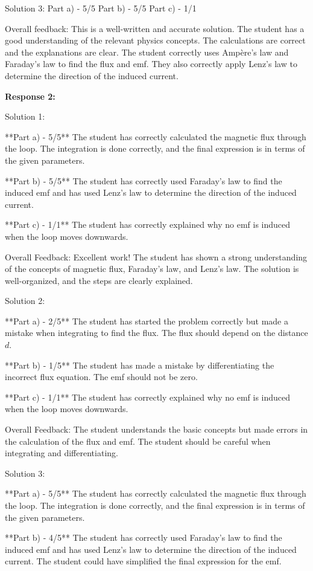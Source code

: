 \documentclass[a4paper,11pt]{article}
\begin{document}
Solution 3:
Part a) - 5/5
Part b) - 5/5
Part c) - 1/1

Overall feedback: This is a well-written and accurate solution. The student has a good understanding of the relevant physics concepts. The calculations are correct and the explanations are clear. The student correctly uses Ampère's law and Faraday's law to find the flux and emf. They also correctly apply Lenz's law to determine the direction of the induced current.

\bigskip    
\textbf{Response 2:}

Solution 1:

**Part a) - 5/5**
The student has correctly calculated the magnetic flux through the loop. The integration is done correctly, and the final expression is in terms of the given parameters.

**Part b) - 5/5**
The student has correctly used Faraday's law to find the induced emf and has used Lenz's law to determine the direction of the induced current.

**Part c) - 1/1**
The student has correctly explained why no emf is induced when the loop moves downwards.

Overall Feedback: Excellent work! The student has shown a strong understanding of the concepts of magnetic flux, Faraday's law, and Lenz's law. The solution is well-organized, and the steps are clearly explained.

Solution 2:

**Part a) - 2/5**
The student has started the problem correctly but made a mistake when integrating to find the flux. The flux should depend on the distance \(d\).

**Part b) - 1/5**
The student has made a mistake by differentiating the incorrect flux equation. The emf should not be zero.

**Part c) - 1/1**
The student has correctly explained why no emf is induced when the loop moves downwards.

Overall Feedback: The student understands the basic concepts but made errors in the calculation of the flux and emf. The student should be careful when integrating and differentiating.

Solution 3:

**Part a) - 5/5**
The student has correctly calculated the magnetic flux through the loop. The integration is done correctly, and the final expression is in terms of the given parameters.

**Part b) - 4/5**
The student has correctly used Faraday's law to find the induced emf and has used Lenz's law to determine the direction of the induced current. The student could have simplified the final expression for the emf.
\end{document}
